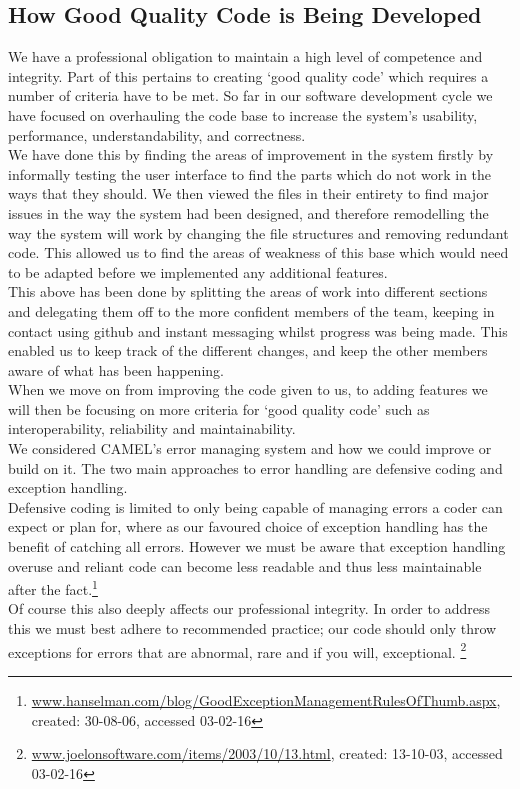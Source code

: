 \subsection*{How Good Quality Code is Being Developed}

We have a professional obligation to maintain a high level of competence and integrity. Part of this pertains to creating ‘good quality code’ which requires a number of criteria have to be met. So far in our software development cycle we have focused on overhauling the code base to increase the system's usability, performance, understandability, and correctness.\\

We have done this by finding the areas of improvement in the system firstly by informally testing the user interface to find the parts which do not work in the ways that they should. We then viewed the files in their entirety to find major issues in the way the system had been designed, and therefore remodelling the way the system will work by changing the file structures and removing redundant code. This allowed us to find the areas of weakness of this base which would need to be adapted before we implemented any additional features.\\

This above has been done by splitting the areas of work into different sections and delegating them off to the more confident members of the team, keeping in contact using github and instant messaging whilst progress was being made. This enabled us to keep track of the different changes, and keep the other members aware of what has been happening.\\

When we move on from improving the code given to us, to adding features we will then be focusing on more criteria for ‘good quality code’ such as interoperability, reliability and maintainability.\\

We considered CAMEL’s error managing system and how we could improve or build on it. The two main approaches to error handling are defensive coding  and exception handling.\\

Defensive coding is limited to only being capable of managing errors a coder can expect or plan for, where as our favoured choice of exception handling has the benefit of catching all errors. However we must be aware that exception handling overuse and reliant code can become less readable and thus less maintainable after the fact.\footnote{\url{ www.hanselman.com/blog/GoodExceptionManagementRulesOfThumb.aspx}, created: 30-08-06, accessed 03-02-16}\\

Of course this also deeply affects our professional integrity. In order to address this we must best adhere to recommended practice; our code should only throw exceptions for errors that are abnormal, rare and if you will, exceptional. \footnote{\url{ www.joelonsoftware.com/items/2003/10/13.html}, created: 13-10-03, accessed 03-02-16}\\



